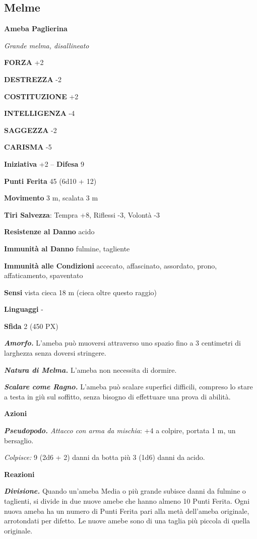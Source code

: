 \begin{multicols}{2}
\subsection{Melme}

\medskip{}\textbf{Ameba Paglierina}

\textit{Grande melma, disallineato}

\textbf{FORZA} +2

\textbf{DESTREZZA} -2

\textbf{COSTITUZIONE} +2

\textbf{INTELLIGENZA} -4

\textbf{SAGGEZZA} -2

\textbf{CARISMA} -5

\textbf{Iniziativa} +2 -- \textbf{Difesa} 9

\textbf{Punti Ferita} 45 (6d10 + 12)

\textbf{Movimento} 3 m, scalata 3 m

\textbf{Tiri Salvezza}: Tempra +8, Riflessi -3, Volontà -3

\textbf{Resistenze al Danno} acido

\textbf{Immunità al Danno} fulmine, tagliente

\textbf{Immunità alle Condizioni} accecato, affascinato, assordato, prono, affaticamento, spaventato

\textbf{Sensi} vista cieca 18 m (cieca oltre questo raggio)

\textbf{Linguaggi} -

\textbf{Sfida} 2 (450 PX)

\textit{\textbf{Amorfo.}} L'ameba può muoversi attraverso uno spazio fino a 3 centimetri di larghezza senza doversi stringere.

\textit{\textbf{Natura di Melma.}} L'ameba non necessita di dormire.

\textit{\textbf{Scalare come Ragno.}} L'ameba può scalare superfici difficili, compreso lo stare a testa in giù sul soffitto, senza bisogno di effettuare una prova di abilità.

\textbf{Azioni}

\textit{\textbf{Pseudopodo.} Attacco con arma da mischia}: +4 a colpire, portata 1 m, un bersaglio.

\textit{Colpisce:} 9 (2d6 + 2) danni da botta più 3 (1d6) danni da acido.

\textbf{Reazioni}

\textit{\textbf{Divisione.}} Quando un'ameba Media o più grande subisce danni da fulmine o taglienti, si divide in due nuove amebe che hanno almeno 10 Punti Ferita. Ogni nuova ameba ha un numero di Punti Ferita pari alla metà dell'ameba originale, arrotondati per difetto. Le nuove amebe sono di una taglia più piccola di quella originale.


\end{multicols}
